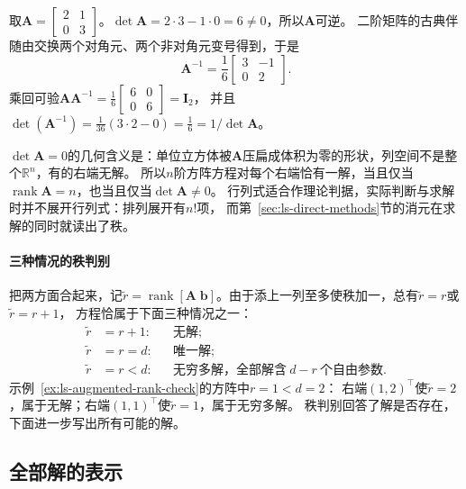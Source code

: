 \begin{example}[用伴随矩阵求二阶逆]
\label{ex:ls-adjugate-two-by-two}
取$\bm A=\left[\begin{smallmatrix}2&1\\0&3\end{smallmatrix}\right]$。$\det\bm A=2\cdot3-1\cdot0=6\neq0$，所以$\bm A$可逆。
二阶矩阵的古典伴随由交换两个对角元、两个非对角元变号得到，于是
\[
 \bm A^{-1}=\frac16\begin{bmatrix}3&-1\\0&2\end{bmatrix}.
\]
乘回可验$\bm A\bm A^{-1}=\frac16\left[\begin{smallmatrix}6&0\\0&6\end{smallmatrix}\right]=\bm I_2$，
并且$\det(\bm A^{-1})=\frac1{36}(3\cdot2-0)=\frac16=1/\det\bm A$。
\end{example}

$\det\bm A=0$的几何含义是：单位立方体被$\bm A$压扁成体积为零的形状，列空间不是整个$\mathbb R^n$，有的右端无解。
所以$n$阶方阵方程对每个右端恰有一解，当且仅当$\operatorname{rank}\bm A=n$，也当且仅当$\det\bm A\neq0$。
行列式适合作理论判据，实际判断与求解时并不展开行列式：排列展开有$n!$项，
而第~\ref{sec:ls-direct-methods}节的消元在求解的同时就读出了秩。

\paragraph{三种情况的秩判别}

把两方面合起来，记$\tilde r=\operatorname{rank}[\bm A\;\bm b]$。由于添上一列至多使秩加一，总有$\tilde r=r$或$\tilde r=r+1$，
方程恰属于下面三种情况之一：
\[
 \begin{aligned}
  \tilde r&=r+1: &&\text{无解};\\
  \tilde r&=r=d: &&\text{唯一解};\\
  \tilde r&=r<d: &&\text{无穷多解，全部解含}\ d-r\ \text{个自由参数}.
 \end{aligned}
\]
示例~\ref{ex:ls-augmented-rank-check}的方阵中$r=1<d=2$：
右端$(1,2)^\top$使$\tilde r=2$，属于无解；右端$(1,1)^\top$使$\tilde r=1$，属于无穷多解。
秩判别回答了解是否存在，下面进一步写出所有可能的解。

\subsection{全部解的表示}
\label{sec:ls-select-among-solutions}
\label{sec:linear-algebra-affine-relations}

